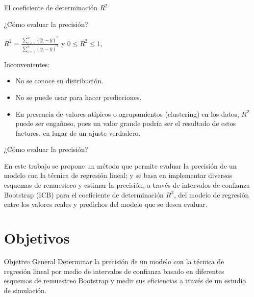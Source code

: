 \documentclass[serif, aspectratio=169]{beamer}
\begin{document}
\begin{frame}{El coeficiente de determinación $R^2$}
	
	\begin{exampleblock}{¿Cómo evaluar la precisión?}
	\end{exampleblock}	


	\begin{center}
	{\Large $R^{2} = \frac{ \sum_{i=1}^{n} ( \hat{y}_{i} - \bar{y})^{2}} { \sum_{i=1}^{n} ( y_{i} - \bar{y})^{2}  }$ }  y  $ 0 \leq R^{2} \leq 1$,
	\end{center}
	
	\vspace{0.3cm}
	
	Inconvenientes:
	\begin{itemize}
		\item No se conoce su distribución.
		\item No se puede usar para hacer predicciones.
		\item En presencia de valores atípicos o agrupamientos (clustering) en los datos, $R^{2}$ puede ser engañoso, pues un valor grande podría ser el resultado de estos factores, en lugar de un ajuste verdadero.
	\end{itemize}

\end{frame}




\begin{frame}{¿Cómo evaluar la precisión?}
	

\begin{justify}
			En este trabajo se propone un método que permite evaluar la precisión de un modelo con la técnica de regresión lineal; y se basa en implementar diversos esquemas de remuestreo y estimar la precisión, a través de intervalos de confianza Bootstrap (ICB) para el coeficiente de determinación $R^2$, del modelo de regresión entre los valores reales y predichos del modelo que se desea evaluar.
\end{justify}

	
\end{frame}





\section{Objetivos}

\begin{frame}{Objetivo General}
Determinar la precisión de un modelo con la técnica de regresión lineal por medio de intervalos de confianza basado en diferentes esquemas de remuestreo Bootstrap y medir sus eficiencias a través de un estudio de simulación.
\end{frame}
\end{document}
